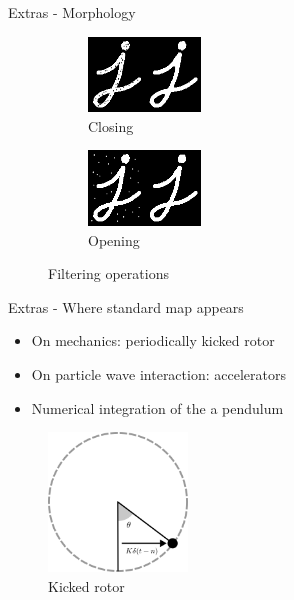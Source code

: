 \documentclass[10pt]{beamer}
\begin{document}
\begin{frame}{Extras - Morphology}
    \begin{figure}
        \begin{subfigure}[b]{0.25\textwidth}
            \includegraphics[height = 2cm]{imgs/closing.png}
            \caption{Closing}
        \end{subfigure}\hspace{1cm}
        \begin{subfigure}[b]{0.25\textwidth}
            \includegraphics[height = 2cm]{imgs/opening.png}
            \caption{Opening}
        \end{subfigure}
        \caption{Filtering operations}
    \end{figure}






\end{frame}

\begin{frame}{Extras - Where standard map appears}
    \begin{itemize}
        \item On mechanics: periodically kicked rotor
        \item On particle wave interaction: accelerators
        \item Numerical integration of the a pendulum
    \end{itemize}

    \begin{figure}
        \includegraphics[width = 0.33\textwidth]{imgs/rotor.png}
        \caption{Kicked rotor}
    \end{figure}

\end{frame}
\end{document}
